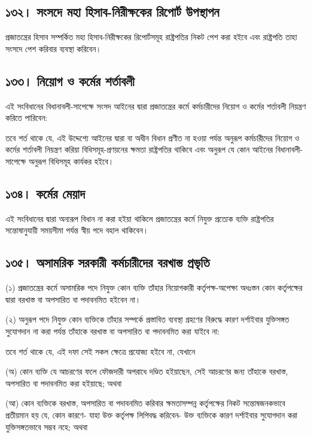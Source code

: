 \documentclass[11pt]{article}
\begin{document}
\subsection{১৩২। সংসদে মহা হিসাব-নিরীক্ষকের রিপোর্ট উপস্থাপন}
\label{sec:org219e2fd}
প্রজাতন্ত্রের হিসাব সম্পর্কিত মহা হিসাব-নিরীক্ষকের রিপোর্টসমূহ রাষ্ট্রপতির নিকট
পেশ করা হইবে এবং রাষ্ট্রপতি তাহা সংসদে পেশ করিবার ব্যবস্থা করিবেন।

\subsection{১৩৩। নিয়োগ ও কর্মের শর্তাবলী}
\label{sec:org91cd770}
এই সংবিধানের বিধানাবলী-সাপেক্ষে সংসদ আইনের দ্বারা প্রজাতন্ত্রের কর্মে
কর্মচারীদের নিয়োগ ও কর্মের শর্তাবলী নিয়ন্ত্রণ করিতে পারিবেন:

তবে শর্ত থাকে যে, এই উদ্দেশ্যে আইনের দ্বারা বা অধীন বিধান প্রণীত না হওয়া
পর্যন্ত অনুরূপ কর্মচারীদের নিয়োগ ও কর্মের শর্তাবলী নিয়ন্ত্রণ করিয়া
বিধিসমূহ-প্রণয়নের ক্ষমতা রাষ্ট্রপতির থাকিবে এবং অনুরূপ যে কোন আইনের
বিধানাবলী-সাপেক্ষে অনুরূপ বিধিসমূহ কার্যকর হইবে।

\subsection{১৩৪। কর্মের মেয়াদ}
\label{sec:org8bb223a}
এই সংবিধানের দ্বারা অন্যরূপ বিধান না করা হইয়া থাকিলে প্রজাতন্ত্রের কর্মে
নিযুক্ত প্রত্যেক ব্যক্তি রাষ্ট্রপতির সন্তোষানুযায়ী সময়সীমা পর্যন্ত স্বীয় পদে বহাল
থাকিবেন।

\subsection{১৩৫। অসামরিক সরকারী কর্মচারীদের বরখাস্ত প্রভৃতি}
\label{sec:orge07444c}
(১) প্রজাতন্ত্রের কর্মে অসামরিক পদে নিযুক্ত কোন ব্যক্তি তাঁহার নিয়োগকারী
    কর্তৃপক্ষ-অপেক্ষা অধঃস্তন কোন কর্তৃপক্ষের দ্বারা বরখাস্ত বা অপসারিত বা পদাবনমিত
    হইবেন না।

(২) অনুরূপ পদে নিযুক্ত কোন ব্যক্তিকে তাঁহার সম্পর্কে প্রস্তাবিত ব্যবস্থা গ্রহণের
    বিরুদ্ধে কারণ দর্শাইবার যুক্তিসঙ্গত সুযোগদান না করা পর্যন্ত তাঁহাকে বরখাস্ত বা
    অপসারিত বা পদাবনমিত করা যাইবে না:

তবে শর্ত থাকে যে, এই দফা সেই সকল ক্ষেত্রে প্রযোজ্য হইবে না, যেখানে

(অ) কোন ব্যক্তি যে আচরণের ফলে ফৌজদারী অপরাধে দণ্ডিত হইয়াছেন, সেই আচরণের
    জন্য তাঁহাকে বরখাস্ত, অপসারিত বা পদাবনমিত করা হইয়াছে; অথবা

(আ) কোন ব্যক্তিকে বরখাস্ত, অপসারিত বা পদাবনমিত করিবার ক্ষমতাসম্পন্ন কর্তৃপক্ষের
    নিকট সন্তোষজনকভাবে প্রতীয়মান হয় যে, কোন কারণে- যাহা উক্ত কর্তৃপক্ষ লিপিবদ্ধ
    করিবেন- উক্ত ব্যক্তিকে কারণ দর্শাইবার সুযোগদান করা যুক্তিসঙ্গতভাবে সম্ভব নহে;
    অথবা
\end{document}
